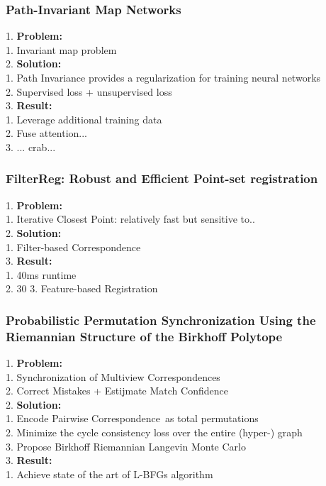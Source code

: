 \subsubsection{Path-Invariant Map Networks}
    1. {\bf Problem:} \\
        1. Invariant map problem \\
    2. {\bf Solution:} \\
        1. Path Invariance provides a regularization for training neural networks \\
        2. Supervised loss + unsupervised loss \\
    3. {\bf Result:} \\
        1. Leverage additional training data \\
        2. Fuse attention... \\
        3. ... crab... \\
\subsubsection{FilterReg: Robust and Efficient Point-set registration}
    1. {\bf Problem:} \\
        1. Iterative Closest Point: relatively fast but sensitive to.. \\
    2. {\bf Solution:} \\
        1. Filter-based Correspondence \\
    3. {\bf Result:}  \\
        1. 40ms runtime \\
        2. 30%
        3. Feature-based Registration \\
\subsubsection{Probabilistic Permutation Synchronization Using the Riemannian Structure of the Birkhoff Polytope}
    1. {\bf Problem:} \\
        1. Synchronization of Multiview Correspondences \\
        2. Correct Mistakes + Estijmate Match Confidence \\
    2. {\bf Solution:} \\
        1. Encode Pairwise Correspondence\ as total permutations \\
        2. Minimize the cycle consistency loss over the entire (hyper-) graph \\
        3. Propose Birkhoff Riemannian Langevin Monte Carlo \\
    3. {\bf Result:} \\
        1. Achieve state of the art of L-BFGs algorithm \\
